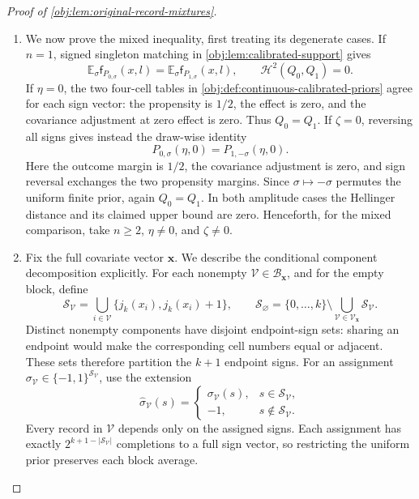 \begin{proof}[Proof of \cref{obj:lem:original-record-mixtures}]
\begin{enumerate}
\item We now prove the mixed inequality, first treating its degenerate
cases. If \(n=1\), signed singleton matching in
\cref{obj:lem:calibrated-support} gives
\[
\mathbb E_\sigma\mathsf f_{P_{0,\sigma}}(x,l)
=\mathbb E_\sigma\mathsf f_{P_{1,\sigma}}(x,l),
\qquad
\mathcal H^2(Q_0,Q_1)=0.
\]
If \(\eta=0\), the two four-cell tables in
\cref{obj:def:continuous-calibrated-priors} agree for each sign vector:
the propensity is \(1/2\), the effect is zero, and the covariance
adjustment at zero effect is zero. Thus \(Q_0=Q_1\).
If \(\zeta=0\), reversing all signs gives instead the draw-wise identity
\[
P_{0,\sigma}(\eta,0)=P_{1,-\sigma}(\eta,0).
\]
Here the outcome margin is \(1/2\), the covariance adjustment is zero,
and sign reversal exchanges the two propensity margins. Since
\(\sigma\mapsto-\sigma\) permutes the uniform finite prior, again
\(Q_0=Q_1\). In both amplitude cases the Hellinger distance and its
claimed upper bound are zero. Henceforth, for the mixed comparison,
take \(n\ge2\), \(\eta\ne0\), and \(\zeta\ne0\).

\item Fix the full covariate vector \(\mathbf x\). We describe the
conditional component decomposition explicitly. For each nonempty
\(\mathcal V\in\mathscr B_{\mathbf x}\), and for the empty block, define
\[
\mathscr S_{\mathcal V}
=\bigcup_{i\in\mathcal V}\{j_k(x_i),j_k(x_i)+1\},
\qquad
\mathscr S_{\varnothing}
=\{0,\ldots,k\}\setminus
\bigcup_{\mathcal V\in\mathscr V_{\mathbf x}}\mathscr S_{\mathcal V}.
\]
Distinct nonempty components have disjoint endpoint-sign sets: sharing
an endpoint would make the corresponding cell numbers equal or
adjacent. These sets therefore partition the \(k+1\) endpoint signs.
For an assignment
\(\sigma_{\mathcal V}\in\{-1,1\}^{\mathscr S_{\mathcal V}}\), use the
extension
\[
\widehat\sigma_{\mathcal V}(s)
=
\begin{cases}
\sigma_{\mathcal V}(s),&s\in\mathscr S_{\mathcal V},\\
-1,&s\notin\mathscr S_{\mathcal V}.
\end{cases}
\]
Every record in \(\mathcal V\) depends only on the assigned signs.
Each assignment has exactly \(2^{k+1-|\mathscr S_{\mathcal V}|}\)
completions to a full sign vector, so restricting the uniform prior
preserves each block average.


\end{enumerate}
\end{proof}
